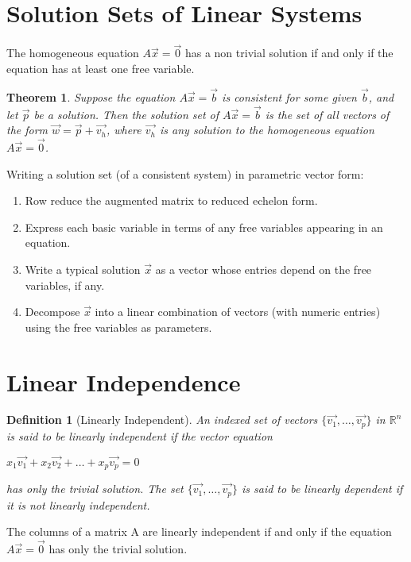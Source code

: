 \documentclass[oneside]{report}
\newtheorem{theorem}{Theorem}[section]
\newtheorem{definition}{Definition}[section]
\begin{document}
\section{Solution Sets of Linear Systems}

The homogeneous equation $A\vec{x} = \vec{0}$ has a non trivial solution if and only if the equation has at least one free variable.

\begin{theorem}
  Suppose the equation $A\vec{x} = \vec{b}$ is consistent for some given $\vec{b}$, and let $\vec{p}$ be a solution. Then the solution set of $A\vec{x} = \vec{b}$ is the set of all vectors of the form $\vec{w} = \vec{p} + \vec{v_h}$, where $\vec{v_h}$ is any solution to the homogeneous equation $A\vec{x} = \vec{0}$.
\end{theorem}

Writing a solution set (of a consistent system) in parametric vector form:
\begin{enumerate}
  \item Row reduce the augmented matrix to reduced echelon form.
  \item Express each basic variable in terms of any free variables appearing in an
equation.
  \item Write a typical solution $\vec{x}$ as a vector whose entries depend on the free
variables, if any.
  \item Decompose $\vec{x}$ into a linear combination of vectors (with numeric entries) using
the free variables as parameters.
\end{enumerate}

\section{Linear Independence}

\begin{definition}[Linearly Independent]
  An indexed set of vectors $\{\vec{v_1}, \dots , \vec{v_p}\}$ in $\mathbb{R}^n$ is said to be linearly independent if the vector equation
  \begin{center}
    $x_1\vec{v_1}+x_2\vec{v_2}+\dots+x_p\vec{v_p} = 0$
  \end{center}
  has only the trivial solution. The set $\{\vec{v_1}, \dots , \vec{v_p}\}$ is said to be linearly dependent if it is not linearly independent.
\end{definition}

The columns of a matrix A are linearly independent if and only if the equation
$A\vec{x} = \vec{0}$ has only the trivial solution. \newline
\end{document}
